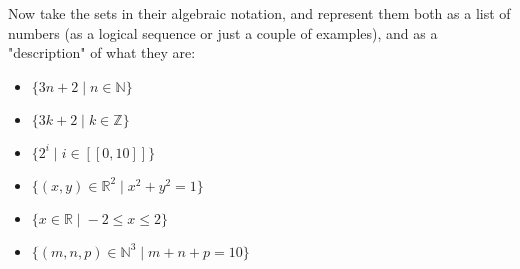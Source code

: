 \documentclass[12pt, letterpaper, twoside]{report}
\begin{document}
Now take the sets in their algebraic notation, and represent them both as a list of numbers (as a logical sequence or just a couple of examples), and as a "description" of what they are:

\begin{itemize}
	\item $\{3n + 2 \; | \; n \in \mathbb{N} \}$
	\item $\{3k + 2 \; | \; k \in \mathbb{Z} \}$
	\item $\{ 2^i \; | \; i \in [[0, 10]] \}$
	\item $\{ (x, y) \in \mathbb{R}^2 \; | \; x^2 + y^2 = 1 \}$
	\item $\{ x \in \mathbb{R} \; | \; -2 \leq x \leq 2 \}$
	\item $\{ (m, n, p) \in \mathbb{N}^3 \; | \; m + n + p = 10 \}$
\end{itemize}

\newpage
\end{document}
